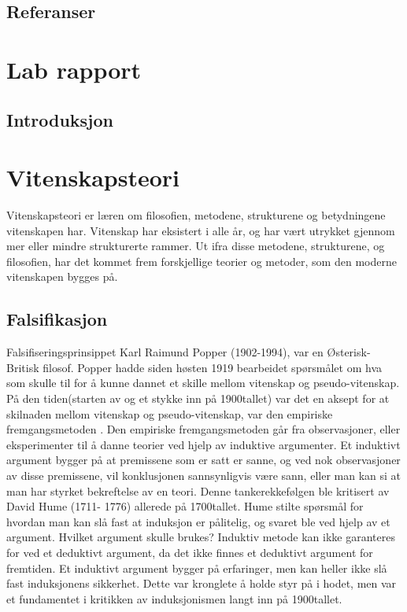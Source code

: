 \documentclass[
]{book}
\begin{document}
\hypertarget{referanser}{%
\section{Referanser}\label{referanser}}

\hypertarget{lab-rapport}{%
\chapter{Lab rapport}\label{lab-rapport}}

\hypertarget{introduksjon-1}{%
\section{Introduksjon}\label{introduksjon-1}}

\hypertarget{vitenskapsteori}{%
\chapter{Vitenskapsteori}\label{vitenskapsteori}}

Vitenskapsteori er læren om filosofien, metodene, strukturene og betydningene vitenskapen har. Vitenskap har eksistert i alle år, og har vært utrykket gjennom mer eller mindre strukturerte rammer. Ut ifra disse metodene, strukturene, og filosofien, har det kommet frem forskjellige teorier og metoder, som den moderne vitenskapen bygges på.

\hypertarget{falsifikasjon}{%
\section{Falsifikasjon}\label{falsifikasjon}}

Falsifiseringsprinsippet Karl Raimund Popper (1902-1994), var en Østerisk-Britisk filosof. Popper hadde siden høsten 1919 bearbeidet spørsmålet om hva som skulle til for å kunne dannet et skille mellom vitenskap og pseudo-vitenskap. På den tiden(starten av og et stykke inn på 1900tallet) var det en aksept for at skilnaden mellom vitenskap og pseudo-vitenskap, var den empiriske fremgangsmetoden \citep{popper2002}. Den empiriske fremgangsmetoden går fra observasjoner, eller eksperimenter til å danne teorier ved hjelp av induktive argumenter. Et induktivt argument bygger på at premissene som er satt er sanne, og ved nok observasjoner av disse premissene, vil konklusjonen sannsynligvis være sann, eller man kan si at man har styrket bekreftelse av en teori. Denne tankerekkefølgen ble kritisert av David Hume (1711- 1776) allerede på 1700tallet. Hume stilte spørsmål for hvordan man kan slå fast at induksjon er pålitelig, og svaret ble ved hjelp av et argument. Hvilket argument skulle brukes? Induktiv metode kan ikke garanteres for ved et deduktivt argument, da det ikke finnes et deduktivt argument for fremtiden. Et induktivt argument bygger på erfaringer, men kan heller ikke slå fast induksjonens sikkerhet. Dette var kronglete å holde styr på i hodet, men var et fundamentet i kritikken av induksjonismen langt inn på 1900tallet.
\end{document}
